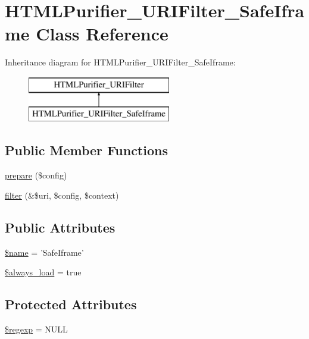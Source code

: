 \hypertarget{classHTMLPurifier__URIFilter__SafeIframe}{\section{H\+T\+M\+L\+Purifier\+\_\+\+U\+R\+I\+Filter\+\_\+\+Safe\+Iframe Class Reference}
\label{classHTMLPurifier__URIFilter__SafeIframe}
}
Inheritance diagram for H\+T\+M\+L\+Purifier\+\_\+\+U\+R\+I\+Filter\+\_\+\+Safe\+Iframe\+:\begin{figure}[H]
\begin{center}
\leavevmode
\includegraphics[height=2.000000cm]{classHTMLPurifier__URIFilter__SafeIframe}
\end{center}
\end{figure}
\subsection*{Public Member Functions}
\begin{DoxyCompactItemize}
\item 
\hyperlink{classHTMLPurifier__URIFilter__SafeIframe_aa16b62700a671ec18359e127c08c3eea}{prepare} (\$config)
\item 
\hyperlink{classHTMLPurifier__URIFilter__SafeIframe_a60491e09185f9ed127180b88d8202608}{filter} (\&\$uri, \$config, \$context)
\end{DoxyCompactItemize}
\subsection*{Public Attributes}
\begin{DoxyCompactItemize}
\item 
\hyperlink{classHTMLPurifier__URIFilter__SafeIframe_a7da0f2963e27f8fdea9cc3aa9e13a485}{\$name} = 'Safe\+Iframe'
\item 
\hyperlink{classHTMLPurifier__URIFilter__SafeIframe_a63db7026d31166a6562e5e1544894125}{\$always\+\_\+load} = true
\end{DoxyCompactItemize}
\subsection*{Protected Attributes}
\begin{DoxyCompactItemize}
\item 
\hyperlink{classHTMLPurifier__URIFilter__SafeIframe_aa1e2f702420080c5c5388d71482579b8}{\$regexp} = N\+U\+L\+L
\end{DoxyCompactItemize}


